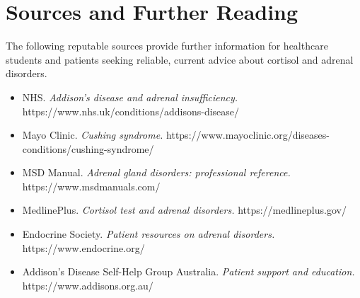 \section*{Sources and Further Reading}
The following reputable sources provide further information for healthcare students and patients seeking reliable, current advice about cortisol and adrenal disorders.

\begin{itemize}
    \item NHS. \textit{Addison's disease and adrenal insufficiency.} https://www.nhs.uk/conditions/addisons-disease/
    \item Mayo Clinic. \textit{Cushing syndrome.} https://www.mayoclinic.org/diseases-conditions/cushing-syndrome/
    \item MSD Manual. \textit{Adrenal gland disorders: professional reference.} https://www.msdmanuals.com/
    \item MedlinePlus. \textit{Cortisol test and adrenal disorders.} https://medlineplus.gov/
    \item Endocrine Society. \textit{Patient resources on adrenal disorders.} https://www.endocrine.org/
    \item Addison's Disease Self-Help Group Australia. \textit{Patient support and education.} https://www.addisons.org.au/
\end{itemize}

